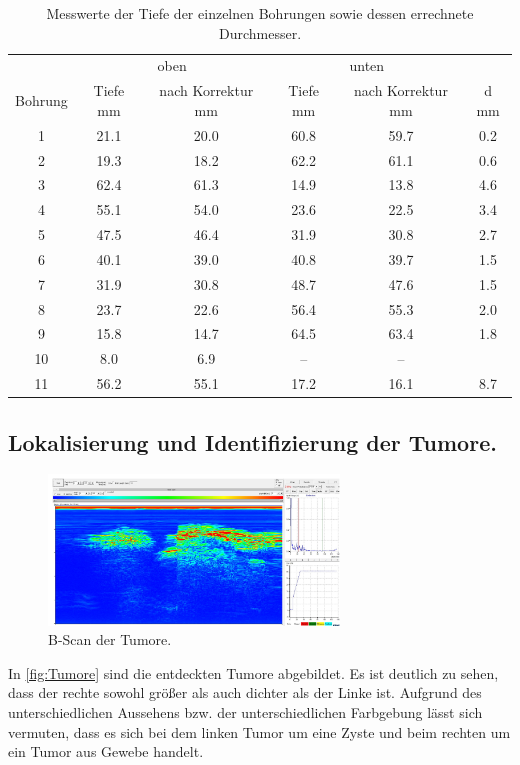 \begin{table}
    \centering 
    \caption{Messwerte der Tiefe der einzelnen Bohrungen sowie dessen errechnete Durchmesser.}
\begin{tabular}{c | c c | c c | c}
    \toprule
    & \multicolumn{2}{c}{oben}& \multicolumn{2}{c}{unten} & \\
    Bohrung & Tiefe \/\unit{\mm} &  nach Korrektur \/\unit{\mm}& Tiefe \/ \unit{\mm} & nach Korrektur \/ \unit{\mm} & d \/ \unit{\mm}\\
    \midrule
           1 & 21.1 & 20.0 & 60.8 & 59.7 & 0.2\\
           2 & 19.3 & 18.2 & 62.2 & 61.1 & 0.6\\
           3 & 62.4 & 61.3 & 14.9 & 13.8 & 4.6\\
           4 & 55.1 & 54.0 & 23.6 & 22.5 & 3.4\\
           5 & 47.5 & 46.4 & 31.9 & 30.8 & 2.7\\
           6 & 40.1 & 39.0 & 40.8 & 39.7 & 1.5\\
           7 & 31.9 & 30.8 & 48.7 & 47.6 & 1.5\\
           8 & 23.7 & 22.6 & 56.4 & 55.3 & 2.0\\
           9 & 15.8 & 14.7 & 64.5 & 63.4 & 1.8\\
           10& 8.0  & 6.9  & -- & -- &     \\
           11& 56.2 & 55.1 & 17.2 & 16.1 & 8.7\\
    \bottomrule
    \end{tabular}
    \label{tab:BScan}
\end{table}

\subsection{Lokalisierung und Identifizierung der Tumore.}
\begin{figure}
    \centering
    \includegraphics[height = 4cm]{vier.pdf}
    \caption{B-Scan der Tumore.}
    \label{fig:Tumore}
\end{figure}
In \autoref{fig:Tumore} sind die entdeckten Tumore abgebildet. Es ist deutlich zu sehen, dass der rechte sowohl größer als auch dichter als der Linke ist. Aufgrund des unterschiedlichen Aussehens bzw. der
unterschiedlichen Farbgebung lässt sich vermuten, dass es sich bei dem linken Tumor um eine Zyste und beim rechten um ein Tumor aus Gewebe handelt.